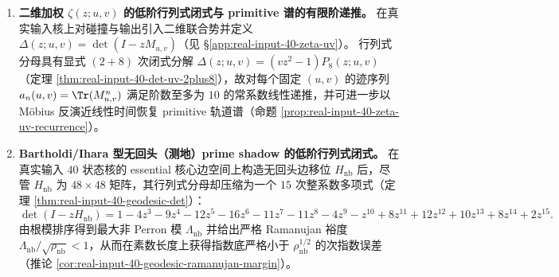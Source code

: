 \begin{enumerate}
  \item \textbf{二维加权 \texorpdfstring{$\zeta(z;u,v)$}{zeta(z;u,v)} 的低阶行列式闭式与 primitive 谱的有限阶递推。}
  在真实输入核上对碰撞与输出引入二维联合势并定义 \(\Delta(z;u,v)=\det(I-zM_{u,v})\)（见 \S\ref{app:real-input-40-zeta-uv}）。
  行列式分母具有显式 \((2+8)\) 次闭式分解 \(\Delta(z;u,v)=(vz^2-1)P_8(z;u,v)\)（定理 \ref{thm:real-input-40-det-uv-2plus8}），故对每个固定 \((u,v)\) 的迹序列 \(a_n(u,v)=\Tr(M_{u,v}^n)\) 满足阶数至多为 \(10\) 的常系数线性递推，并可进一步以 Möbius 反演近线性时间恢复 primitive 轨道谱（命题 \ref{prop:real-input-40-zeta-uv-recurrence}）。

  \item \textbf{Bartholdi/Ihara 型无回头（测地）prime shadow 的低阶行列式闭式。}
  在真实输入 \(40\) 状态核的 essential 核心边空间上构造无回头边移位 \(H_{\mathrm{nb}}\) 后，尽管 \(H_{\mathrm{nb}}\) 为 \(48\times48\) 矩阵，其行列式分母却压缩为一个 \(15\) 次整系数多项式（定理 \ref{thm:real-input-40-geodesic-det}）：
  \[
  \det(I-zH_{\mathrm{nb}})
  =1-4z^3-9z^4-12z^5-16z^6-11z^7-11z^8-4z^9-z^{10}
  +8z^{11}+12z^{12}+10z^{13}+8z^{14}+2z^{15}.
  \]
  由根模排序得到最大非 Perron 模 \(\Lambda_{\mathrm{nb}}\) 并给出严格 Ramanujan 裕度 \(\Lambda_{\mathrm{nb}}/\sqrt{\rho_{\mathrm{nb}}}<1\)，从而在素数长度上获得指数底严格小于 \(\rho_{\mathrm{nb}}^{1/2}\) 的次指数误差（推论 \ref{cor:real-input-40-geodesic-ramanujan-margin}）。
\end{enumerate}

